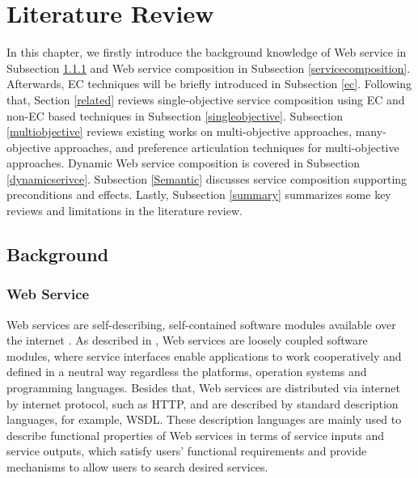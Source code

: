 \chapter{Literature Review}\label{C:review}
In this chapter, we firstly introduce the background knowledge of Web service in Subsection \ref{service} and Web service composition in Subsection \ref{servicecomposition}. Afterwards, EC techniques will be briefly introduced in Subsection \ref{ec}. Following that, Section \ref{related} reviews single-objective service composition using EC and non-EC based techniques in Subsection \ref{singleobjective}.  Subsection  \ref{multiobjective} reviews existing works on multi-objective approaches, many-objective approaches, and preference articulation techniques for multi-objective approaches. Dynamic Web service composition is covered in Subsection \ref{dynamicserivce}. Subsection \ref{Semantic}  discusses service composition supporting preconditions and effects. Lastly, Subsection \ref{summary} summarizes some key reviews and limitations in the literature review.
\section{Background}\label{background}
\subsection{Web Service}\label{service}

Web services are self-describing, self-contained software modules available over the internet \cite{erl2004service}. As described in \cite{erl2004service}, Web services are loosely coupled software modules, where service interfaces enable applications to work cooperatively and defined in a neutral way regardless the platforms, operation systems and programming languages. Besides that, Web services are distributed via internet by internet protocol, such as HTTP, and are described by standard description languages, for example, WSDL. These description languages are mainly used to describe functional properties of Web services in terms of service inputs and service outputs, which satisfy users' functional requirements and provide mechanisms to allow users to search desired services. 

